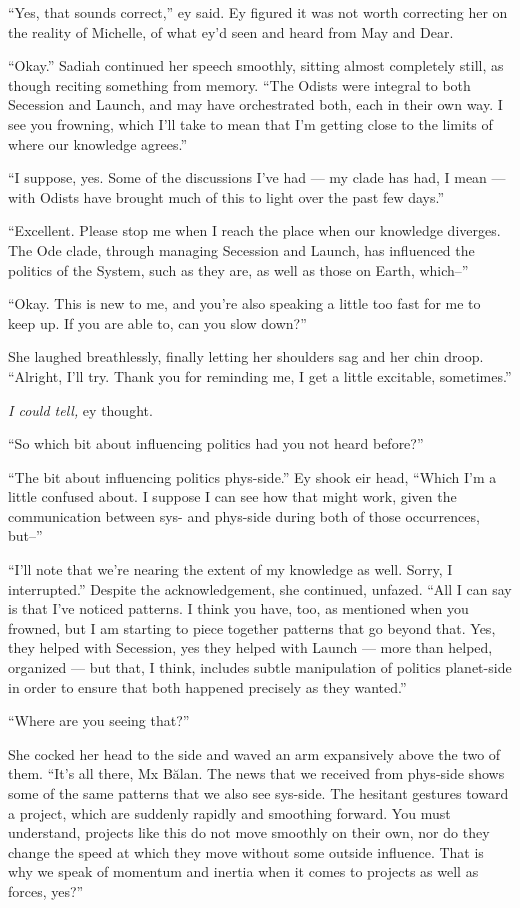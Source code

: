 ``Yes, that sounds correct,'' ey said. Ey figured it was not worth correcting her on the reality of Michelle, of what ey'd seen and heard from May and Dear.

``Okay.'' Sadiah continued her speech smoothly, sitting almost completely still, as though reciting something from memory. ``The Odists were integral to both Secession and Launch, and may have orchestrated both, each in their own way. I see you frowning, which I'll take to mean that I'm getting close to the limits of where our knowledge agrees.''

``I suppose, yes. Some of the discussions I've had — my clade has had, I mean — with Odists have brought much of this to light over the past few days.''

``Excellent. Please stop me when I reach the place when our knowledge diverges. The Ode clade, through managing Secession and Launch, has influenced the politics of the System, such as they are, as well as those on Earth, which--''

``Okay. This is new to me, and you're also speaking a little too fast for me to keep up. If you are able to, can you slow down?''

She laughed breathlessly, finally letting her shoulders sag and her chin droop. ``Alright, I'll try. Thank you for reminding me, I get a little excitable, sometimes.''

\emph{I could tell,} ey thought.

``So which bit about influencing politics had you not heard before?''

``The bit about influencing politics phys-side.'' Ey shook eir head, ``Which I'm a little confused about. I suppose I can see how that might work, given the communication between sys- and phys-side during both of those occurrences, but--''

``I'll note that we're nearing the extent of my knowledge as well. Sorry, I interrupted.'' Despite the acknowledgement, she continued, unfazed. ``All I can say is that I've noticed patterns. I think you have, too, as mentioned when you frowned, but I am starting to piece together patterns that go beyond that. Yes, they helped with Secession, yes they helped with Launch — more than helped, organized — but that, I think, includes subtle manipulation of politics planet-side in order to ensure that both happened precisely as they wanted.''

``Where are you seeing that?''

She cocked her head to the side and waved an arm expansively above the two of them. ``It's all there, Mx Bălan. The news that we received from phys-side shows some of the same patterns that we also see sys-side. The hesitant gestures toward a project, which are suddenly rapidly and smoothing forward. You must understand, projects like this do not move smoothly on their own, nor do they change the speed at which they move without some outside influence. That is why we speak of momentum and inertia when it comes to projects as well as forces, yes?''

